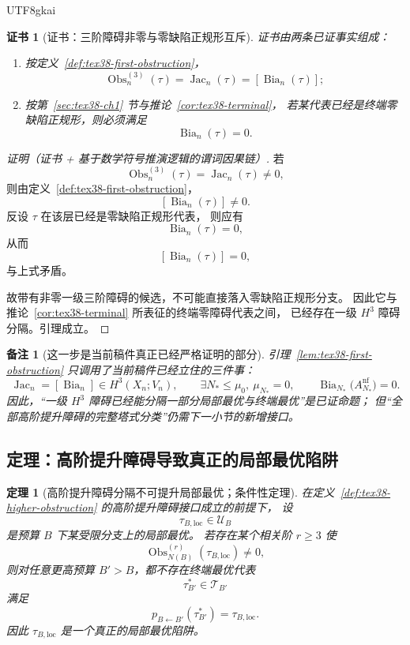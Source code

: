 \documentclass[12pt]{article}
\newtheorem{theorem}{定理}[section]
\newtheorem{remark}{备注}[section]
\newtheorem{Certificate}{证书}[section]
\newcommand{\Bia}{\operatorname{Bia}}
\newcommand{\Jac}{\operatorname{Jac}}
\newcommand{\Obs}{\operatorname{Obs}}
\begin{document}
\begin{CJK*}{UTF8}{gkai}
\begin{Certificate}[证书：三阶障碍非零与零缺陷正规形互斥]
\label{cert:tex38-first-obstruction}
证书由两条已证事实组成：
\begin{enumerate}
  \item 按定义~\ref{def:tex38-first-obstruction}，
  \[
    \Obs^{(3)}_n(\tau)=\Jac_n(\tau)=[\Bia_n(\tau)];
  \]
  \item 按第~\ref{sec:tex38-ch1} 节与推论~\ref{cor:tex38-terminal}，
  若某代表已经是终端零缺陷正规形，则必须满足
  \[
    \Bia_n(\tau)=0.
  \]
\end{enumerate}
\end{Certificate}

\begin{proof}[证明（证书 + 基于数学符号推演逻辑的谓词因果链）]
若
\[
  \Obs^{(3)}_n(\tau)=\Jac_n(\tau)\neq 0,
\]
则由定义~\ref{def:tex38-first-obstruction}，
\[
  [\Bia_n(\tau)]\neq 0.
\]
反设 $\tau$ 在该层已经是零缺陷正规形代表，
则应有
\[
  \Bia_n(\tau)=0,
\]
从而
\[
  [\Bia_n(\tau)]=0,
\]
与上式矛盾。

故带有非零一级三阶障碍的候选，不可能直接落入零缺陷正规形分支。
因此它与推论~\ref{cor:tex38-terminal} 所表征的终端零障碍代表之间，
已经存在一级 $H^3$ 障碍分隔。引理成立。
\end{proof}

\begin{remark}[这一步是当前稿件真正已经严格证明的部分]
引理~\ref{lem:tex38-first-obstruction} 只调用了当前稿件已经立住的三件事：
\[
  \Jac_n=[\Bia_n]\in H^3(X_n;V_n),
  \qquad
  \exists N_\ast\le\mu_0,\ \mu_{N_\ast}=0,
  \qquad
  \Bia_{N_\ast}\bigl(A_{N_\ast}^{\mathrm{nf}}\bigr)=0.
\]
因此，“一级 $H^3$ 障碍已经能分隔一部分局部最优与终端最优”是已证命题；
但“全部高阶提升障碍的完整塔式分类”仍需下一小节的新增接口。
\end{remark}

\subsection{定理：高阶提升障碍导致真正的局部最优陷阱}
\label{subsec:tex38-higher-obstruction}

\begin{theorem}[高阶提升障碍分隔不可提升局部最优；条件性定理]
\label{thm:tex38-higher-obstruction}
在定义~\ref{def:tex38-higher-obstruction} 的高阶提升障碍接口成立的前提下，
设
\[
  \tau_{B,\mathrm{loc}}\in\mathcal U_B
\]
是预算 $B$ 下某受限分支上的局部最优。
若存在某个相关阶 $r\ge 3$ 使
\[
  \Obs^{(r)}_{N(B)}(\tau_{B,\mathrm{loc}})\neq 0,
\]
则对任意更高预算 $B'>B$，都不存在终端最优代表
\[
  \tau_{B'}^\ast\in\mathcal T_{B'}
\]
满足
\[
  p_{B\leftarrow B'}(\tau_{B'}^\ast)=\tau_{B,\mathrm{loc}}.
\]
因此 $\tau_{B,\mathrm{loc}}$ 是一个真正的\emph{局部最优陷阱}。
\end{theorem}


\end{CJK*}
\end{document}
